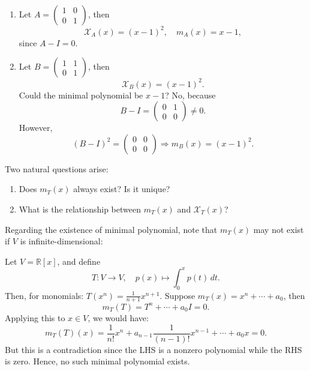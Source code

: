 \begin{example}
\leavevmode
\begin{enumerate}
  \item Let \( A = \begin{pmatrix} 1 & 0 \\ 0 & 1 \end{pmatrix} \), then
  \[
  \mathcal{X}_A(x) = (x - 1)^2, \quad m_A(x) = x - 1,
  \]
  since \( A - I = 0 \).

  \item Let \( B = \begin{pmatrix} 1 & 1 \\ 0 & 1 \end{pmatrix} \), then
  \[
  \mathcal{X}_B(x) = (x - 1)^2.
  \]
  Could the minimal polynomial be \( x - 1 \)? No, because
  \[
  B - I = \begin{pmatrix} 0 & 1 \\ 0 & 0 \end{pmatrix} \neq 0.
  \]
  However,
  \[
  (B - I)^2 = \begin{pmatrix} 0 & 0 \\ 0 & 0 \end{pmatrix} \Rightarrow m_B(x) = (x - 1)^2.
  \]
\end{enumerate}
\end{example}

Two natural questions arise:
\begin{enumerate}
  \item Does \( m_T(x) \) always exist? Is it unique?
  \item What is the relationship between \( m_T(x) \) and \( \mathcal{X}_T(x) \)?
\end{enumerate}

Regarding the existence of minimal polynomial, note that $m_T(x)$ may not exist if \( V \) is infinite-dimensional:
\begin{example}
Let \( V = \mathbb{R}[x] \), and define
\[
T : V \to V, \quad p(x) \mapsto \int_0^x p(t)\, dt.
\]
Then, for monomials: \( T(x^n) = \frac{1}{n+1} x^{n+1} \). Suppose \( m_T(x) = x^n + \cdots + a_0 \), then
\[
m_T(T) = T^n + \cdots + a_0 I = 0.
\]
Applying this to \( x \in V \), we would have:
\[
m_T(T)(x) = \frac{1}{n!} x^n + a_{n-1} \frac{1}{(n-1)!} x^{n-1} + \cdots + a_0 x = 0.
\]
But this is a contradiction since the LHS is a nonzero polynomial while the RHS is zero. Hence, no such minimal polynomial exists.
\end{example}

